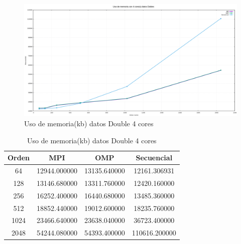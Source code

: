 \documentclass[10pt]{IEEEtran}
\begin{document}
\begin{figure}[H]
  \centering
  \includegraphics[width=0.95\linewidth]{figs/4nucleosDoblesMemoria.png}
  \caption{Uso de memoria(kb) datos Double 4 cores}
  \label{fig:d2}
\end{figure}

\begin{table}[H]
  \caption{Uso de memoria(kb) datos Double 4 cores}
  \label{table_example}
  \centering
  \begin{tabular}{|c|c|c|c|}
    \hline
    \textbf{Orden} & \textbf{MPI} & \textbf{OMP} & \textbf{Secuencial} \\
    \hline
    64 & 12944.000000 & 13135.640000 & 12161.306931 \\
    128 & 13146.680000 & 13311.760000 & 12420.160000 \\
    256 & 16252.400000 & 16440.680000 & 13485.360000 \\
    512 & 18852.440000 & 19012.600000 & 18235.760000 \\
    1024 & 23466.640000 & 23638.040000 & 36723.400000 \\
    2048 & 54244.080000 & 54393.400000 & 110616.200000 \\
    \hline
  \end{tabular}
\end{table}
\end{document}
